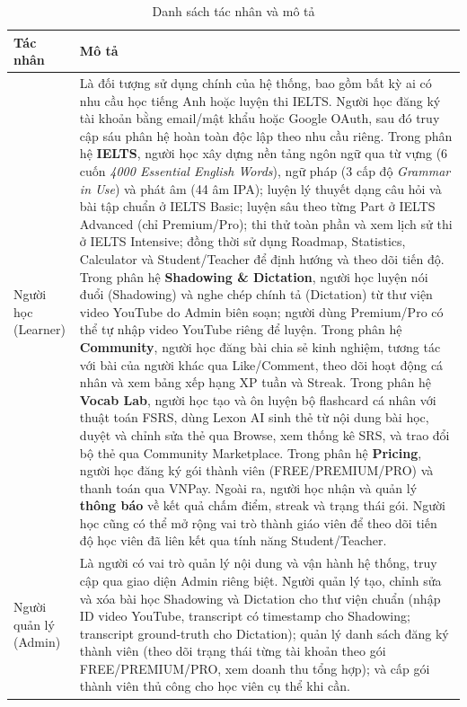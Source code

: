 \begin{table}[H]
    \centering
    \renewcommand{\arraystretch}{1.3}
    \begin{tabularx}{\linewidth}{|l|X|}
        \hline
        \textbf{Tác nhân} & \textbf{Mô tả} \\ \hline
        Người học (Learner) &
        Là đối tượng sử dụng chính của hệ thống, bao gồm bất kỳ ai có nhu cầu học tiếng Anh hoặc luyện thi IELTS. Người học đăng ký tài khoản bằng email/mật khẩu hoặc Google OAuth, sau đó truy cập sáu phân hệ hoàn toàn độc lập theo nhu cầu riêng. Trong phân hệ \textbf{IELTS}, người học xây dựng nền tảng ngôn ngữ qua từ vựng (6 cuốn \textit{4000 Essential English Words}), ngữ pháp (3 cấp độ \textit{Grammar in Use}) và phát âm (44 âm IPA); luyện lý thuyết dạng câu hỏi và bài tập chuẩn ở IELTS Basic; luyện sâu theo từng Part ở IELTS Advanced (chỉ Premium/Pro); thi thử toàn phần và xem lịch sử thi ở IELTS Intensive; đồng thời sử dụng Roadmap, Statistics, Calculator và Student/Teacher để định hướng và theo dõi tiến độ. Trong phân hệ \textbf{Shadowing \& Dictation}, người học luyện nói đuổi (Shadowing) và nghe chép chính tả (Dictation) từ thư viện video YouTube do Admin biên soạn; người dùng Premium/Pro có thể tự nhập video YouTube riêng để luyện. Trong phân hệ \textbf{Community}, người học đăng bài chia sẻ kinh nghiệm, tương tác với bài của người khác qua Like/Comment, theo dõi hoạt động cá nhân và xem bảng xếp hạng XP tuần và Streak. Trong phân hệ \textbf{Vocab Lab}, người học tạo và ôn luyện bộ flashcard cá nhân với thuật toán FSRS, dùng Lexon AI sinh thẻ từ nội dung bài học, duyệt và chỉnh sửa thẻ qua Browse, xem thống kê SRS, và trao đổi bộ thẻ qua Community Marketplace. Trong phân hệ \textbf{Pricing}, người học đăng ký gói thành viên (FREE/PREMIUM/PRO) và thanh toán qua VNPay. Ngoài ra, người học nhận và quản lý \textbf{thông báo} về kết quả chấm điểm, streak và trạng thái gói. Người học cũng có thể mở rộng vai trò thành giáo viên để theo dõi tiến độ học viên đã liên kết qua tính năng Student/Teacher. \\ \hline
        Người quản lý (Admin) &
        Là người có vai trò quản lý nội dung và vận hành hệ thống, truy cập qua giao diện Admin riêng biệt. Người quản lý tạo, chỉnh sửa và xóa bài học Shadowing và Dictation cho thư viện chuẩn (nhập ID video YouTube, transcript có timestamp cho Shadowing; transcript ground-truth cho Dictation); quản lý danh sách đăng ký thành viên (theo dõi trạng thái từng tài khoản theo gói FREE/PREMIUM/PRO, xem doanh thu tổng hợp); và cấp gói thành viên thủ công cho học viên cụ thể khi cần. \\ \hline
    \end{tabularx}
    \caption{Danh sách tác nhân và mô tả}
    \label{tab:actors}
\end{table}


